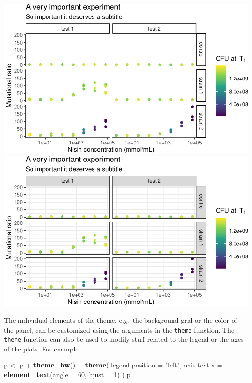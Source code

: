 \documentclass[]{book}
\newenvironment{Shaded}{}{}
\newcommand{\DataTypeTok}[1]{\textcolor[rgb]{0.56,0.13,0.00}{#1}}
\newcommand{\DecValTok}[1]{\textcolor[rgb]{0.25,0.63,0.44}{#1}}
\newcommand{\KeywordTok}[1]{\textcolor[rgb]{0.00,0.44,0.13}{\textbf{#1}}}
\newcommand{\NormalTok}[1]{#1}
\newcommand{\OperatorTok}[1]{\textcolor[rgb]{0.40,0.40,0.40}{#1}}
\newcommand{\StringTok}[1]{\textcolor[rgb]{0.25,0.44,0.63}{#1}}
\begin{document}
\begin{center}\includegraphics[width=\textwidth]{TRES-Tidy-Tutorial_files/figure-latex/unnamed-chunk-144-1} \includegraphics[width=\textwidth]{TRES-Tidy-Tutorial_files/figure-latex/unnamed-chunk-144-2} \end{center}

The individual elements of the theme, e.g.~the background grid or the color of the panel, can be customized using the arguments in the \texttt{theme} function. The \texttt{theme} function can also be used to modify stuff related to the legend or the axes of the plots. For example:

\begin{Shaded}
\begin{Highlighting}[]
\NormalTok{p <-}\StringTok{ }\NormalTok{p }\OperatorTok{+}
\StringTok{  }\KeywordTok{theme_bw}\NormalTok{() }\OperatorTok{+}
\StringTok{  }\KeywordTok{theme}\NormalTok{(}
    \DataTypeTok{legend.position =} \StringTok{"left"}\NormalTok{,}
    \DataTypeTok{axis.text.x =} \KeywordTok{element_text}\NormalTok{(}\DataTypeTok{angle =} \DecValTok{60}\NormalTok{, }\DataTypeTok{hjust =} \DecValTok{1}\NormalTok{)}
\NormalTok{  )}
\NormalTok{p}
\end{Highlighting}
\end{Shaded}
\end{document}
